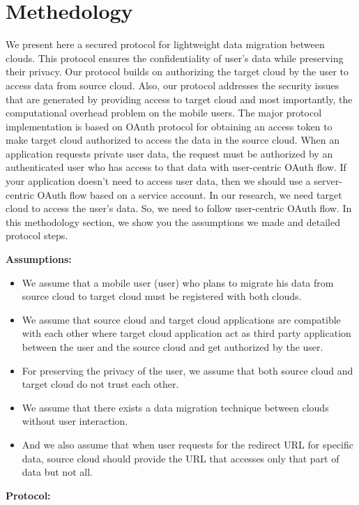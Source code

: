 \documentclass[11pt, pdftex, conference]{IEEEtran}
\begin{document}
\section{\textbf{Methedology}}
\hspace{10mm}We present here a secured protocol for lightweight data migration between clouds. This protocol ensures the confidentiality of user’s data while preserving their privacy. Our protocol builds on authorizing the target cloud by the user to access data from source cloud. Also, our protocol addresses the security issues that are generated by providing access to target cloud and most importantly, the computational overhead problem on the mobile users. The major protocol implementation is based on OAuth protocol for obtaining an access token to make target cloud authorized to access the data in the source cloud. When an application requests private user data, the request must be authorized by an authenticated user who has access to that data with user-centric OAuth flow. If your application doesn't need to access user data, then we should use a server-centric OAuth flow based on a service account. In our research, we need target cloud to access the user's data. So, we need to follow user-centric OAuth flow. In this methodology section, we show you the assumptions we made and detailed protocol steps.
\linebreak \par
\textbf{Assumptions:}
\begin{itemize}
\item We assume that a mobile user (user) who plans to migrate his data from source cloud to target cloud must be registered with both clouds. 
\item We assume that source cloud and target cloud applications are compatible with each other where target cloud application act as third party application between the user and the source cloud and get authorized by the user. 
\item For preserving the privacy of the user, we assume that both source cloud and target cloud do not trust each other.
\item We assume that there exists a data migration technique between clouds without user interaction.
\item And we also assume that when user requests for the redirect URL for specific data, source cloud should provide the URL that accesses only that part of data but not all.
\end{itemize}
\textbf{Protocol:}\linebreak
\end{document}
